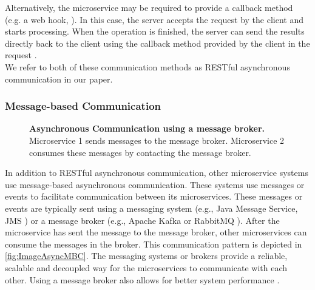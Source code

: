 Alternatively, the microservice may be required to provide a callback method (e.g. a web hook, \cite{Webhooks}).
In this case, the server accepts the request by the client and starts processing.
When the operation is finished, the server can send the results directly back to the client using the callback method provided by the client in the request \cite{Mayer2018}. \\

We refer to both of these communication methods as RESTful asynchronous communication in our paper.


\subsubsection{Message-based Communication}
\label{sec:Foundation:AsyncCommunication:MBC}

\begin{figure}
\centering
{}
\caption{\textbf{Asynchronous Communication using a message broker.} \\
Microservice 1 sends messages to the message broker. Microservice 2 consumes these messages by contacting the message broker.}
\label{fig:ImageAsyncMBC}
\end{figure}

In addition to RESTful asynchronous communication, other microservice systems use message-based asynchronous communication.
These systems use messages or events to facilitate communication between its microservices.
These messages or events are typically sent using a messaging system (e.g., Java Message Service, JMS \cite{JMS}) or a message broker (e.g., Apache Kafka \cite{ApacheKafka} or RabbitMQ \cite{RabbitMQ}).
After the microservice has sent the message to the message broker, other microservices can consume the messages in the broker.
This communication pattern is depicted in \autoref{fig:ImageAsyncMBC}.
The messaging systems or brokers provide a reliable, scalable and decoupled way for the microservices to communicate with each other.
Using a message broker also allows for better system performance \cite{Singh2021}.


